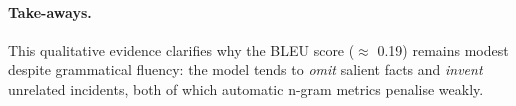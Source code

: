 \documentclass[fleqn,moreauthors,10pt]{ds_report}
\begin{document}
\paragraph{Take-aways.}  
This qualitative evidence clarifies why the BLEU score ($\approx$ 0.19) remains modest despite grammatical fluency: the model tends to \emph{omit} salient facts and \emph{invent} unrelated incidents, both of which automatic n-gram metrics penalise weakly.  




\end{document}
